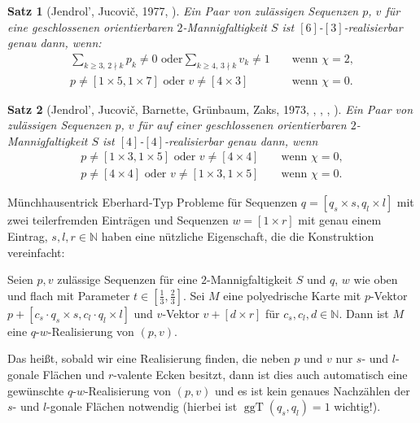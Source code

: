 \documentclass[10pt, notheorems]{beamer}
\newtheorem{theorem}{Satz}[section]
\newcommand{\nats}{\mathbb{N}}
\renewcommand{\gcd}{\operatorname{ggT}}
\begin{document}
\begin{frame}
  \begin{theorem}[{\sc Jendrol', Jucovi{\v{c}}}, 1977, \cite{jendrol1977generalization}] \label{thm:eberhard:extended:3}
    Ein Paar von zulässigen Sequenzen $p$, $v$ für eine geschlossenen orientierbaren $2$-Mannigfaltigkeit $S$ ist $[6]$-$[3]$-realisierbar genau dann, wenn:
    \begin{align*}
      \sum_{k \geq 3,\,2 \nmid k} p_k \neq 0 \text{ oder} \sum_{k \geq 4,\,3 \nmid k} v_k \neq 1& &\text{ wenn } \chi = 2, \\
      p \neq [1 \times 5, 1 \times 7] \text{ oder } v \neq [4 \times 3]& &\text{ wenn } \chi = 0.
    \end{align*}
  \end{theorem}
  \pause
  \begin{theorem}[{\sc Jendrol', Jucovi{\v{c}}, Barnette, Grünbaum, Zaks}, 1973, \cite{jucovivc1973theorem}, \cite{barnette1971toroidal}, \cite{grunbaum1969planar}, \cite{zaks1971analogue}] \label{thm:eberhard:extended:4}
    Ein Paar von zulässigen Sequenzen $p$, $v$ für auf einer geschlossenen orientierbaren $2$-Mannigfaltigkeit $S$ ist $[4]$-$[4]$-realisierbar genau dann, wenn
    \begin{align*}
      p \neq [1 \times 3, 1 \times 5] \text{ oder } v \neq [4 \times 4]& &\text{ wenn } \chi = 0,\\
      p \neq [4 \times 4] \text{ oder } v \neq [1 \times 3, 1 \times 5]& &\text{ wenn } \chi = 0.
    \end{align*}
  \end{theorem}
\end{frame}


\begin{frame}{Münchhausentrick}
  {\sc Eberhard}-Typ Probleme für Sequenzen $q = [q_s \times s, q_l \times l]$ mit zwei teilerfremden Einträgen und Sequenzen $w = [1 \times r]$ mit genau einem Eintrag, $s, l, r \in \nats$ haben eine nützliche Eigenschaft, die die Konstruktion vereinfacht:
  \begin{lemma}
    Seien $p, v$ zulässige Sequenzen für eine $2$-Mannigfaltigkeit $S$ und $q$, $w$ wie oben und flach mit Parameter $t \in \left[\tfrac{1}{3}, \tfrac{2}{3}\right]$. Sei $M$ eine polyedrische Karte mit $p$-Vektor $p + [c_s \cdot q_s \times s, c_l \cdot q_l \times l]$ und $v$-Vektor $v + [d \times r]$ für $c_s, c_l, d \in \nats$. Dann ist $M$ eine $q$-$w$-Realisierung von $(p, v)$.
  \end{lemma}
  \pause
  Das heißt, sobald wir eine Realisierung finden, die neben $p$ und $v$ nur $s$- und $l$-gonale Flächen und $r$-valente Ecken besitzt, dann ist dies auch automatisch eine gewünschte $q$-$w$-Realisierung von $(p, v)$ und es ist kein genaues Nachzählen der \newline $s$- und $l$-gonale Flächen notwendig (hierbei ist $\gcd(q_s, q_l) = 1$ wichtig!).
\end{frame}
\end{document}
